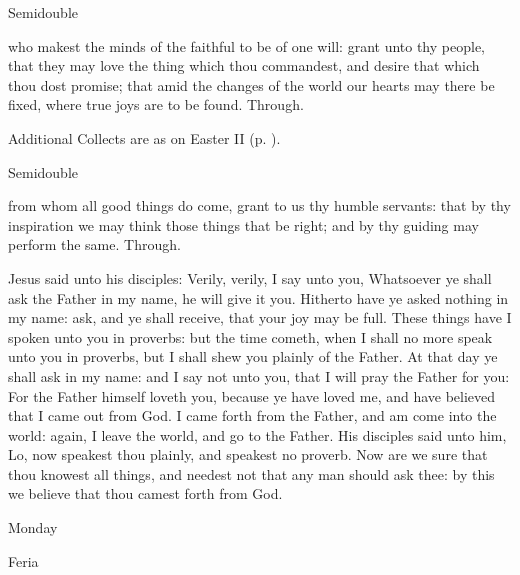 \begin{inhead}
    {Semidouble}
\end{inhead}

\collect
{} who makest the minds of the faithful to be of one will: grant unto thy people, that they may love the thing which thou commandest, and desire that which thou dost promise; that amid the changes of the world our hearts may there be fixed, where true joys are to be found. Through.
\begin{rubric}
    Additional Collects are as on Easter II (p. \pageref{EasterII}).
\end{rubric}

\begin{inhead}
    {Semidouble}
\end{inhead}

\collect
{} from whom all good things do come, grant to us thy humble servants: that by thy inspiration we may think those things that be right; and by thy guiding may perform the same. Through.

 Jesus said unto his disciples: Verily, verily, I say unto you, Whatsoever ye shall ask the Father in my name, he will give it you. Hitherto have ye asked nothing in my name: ask, and ye shall receive, that your joy may be full. These things have I spoken unto you in proverbs: but the time cometh, when I shall no more speak unto you in proverbs, but I shall shew you plainly of the Father. At that day ye shall ask in my name: and I say not unto you, that I will pray the Father for you: For the Father himself loveth you, because ye have loved me, and have believed that I came out from God. I came forth from the Father, and am come into the world: again, I leave the world, and go to the Father. His disciples said unto him, Lo, now speakest thou plainly, and speakest no proverb. Now are we sure that thou knowest all things, and needest not that any man should ask thee: by this we believe that thou camest forth from God.


\par\noindent
\begin{inhead}
    Monday\par
  Feria
\end{inhead}

